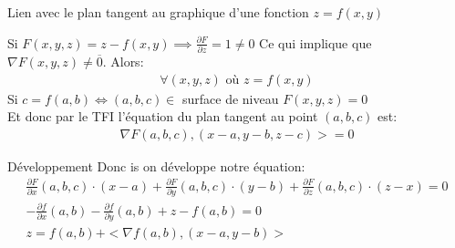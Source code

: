 \begin{parag}{Lien avec le plan tangent au graphique d'une fonction $z = f\left(x, y\right)$}
    
    Si $F\left(x, y, z\right) = z-f\left(x, y\right) \implies \frac{\partial F}{\partial z} = 1 \neq 0 $ Ce qui implique que $\nabla F\left(x, y, z\right) \neq \overline{0}$. Alors:
    \begin{align*} 
    \forall \left(x,y, z\right) \text{ où } z = f\left(x, y\right)\end{align*}
    Si $c = f\left(a, b\right) \iff \left(a, b, c\right) \in $ surface de niveau $F\left(x, y, z\right) = 0$\\
    Et donc par le TFI l'équation du plan tangent au point $\left(a, b, c\right)$ est:
    \begin{align*} \nabla F\left(a, b, c\right), \left(x-a, y-b, z-c\right) > = 0 \end{align*}


    \begin{subparag}{Développement}
        Donc is on développe notre équation:
        \begin{align*} 
            \frac{\partial F}{\partial x} \left(a, b, c\right)\cdot \left(x-a\right) + \frac{\partial F}{\partial y} \left(a, b, c\right) \cdot  \left(y - b\right) + \frac{\partial F}{\partial z} \left(a, b, c\right)\cdot  \left(z-x\right) = 0\\
                - \frac{\partial f}{\partial x} \left(a, b\right) - \frac{\partial f}{\partial y} \left(a, b\right) + z - f\left(a, b\right) = 0\\
                z = f\left(a, b\right) + <\nabla f\left(a, b\right), \left(x-a, y-b\right)>
        \end{align*}
    \end{subparag}
\end{parag}

